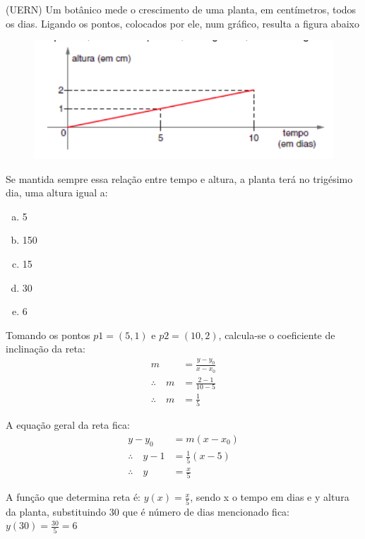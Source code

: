 \begin{multicols*}{2}
    \noindent
    (UERN) Um botânico mede o crescimento de uma planta, em centímetros, todos os dias. Ligando os 			pontos, colocados por ele, num gráfico, resulta a figura abaixo
    \begin{figure}[H]
        \centering
        \includegraphics[scale=0.4]{assets/rafael/img15.png}
    \end{figure}
    Se mantida sempre essa relação entre tempo e altura, a planta terá no trigésimo dia, uma altura 		igual a:
    \noindent
    \begin{enumerate}[(a)]
        \item 5
        \item 150
        \item 15
        \item 30
        \item 6
    \end{enumerate}

    Tomando os pontos $p1= (5,1)$  e $p2 = (10,2)$, calcula-se o coeficiente de inclinação da reta:
    \begin{align*}
        m &= \frac{y - y_0}{x - x_0} \\[1ex]
        \therefore \quad m &= \frac{2 - 1}{10 - 5}\\[1ex]
        \therefore \quad m &= \frac{1}{5}
    \end{align*}

    A equação geral da reta fica: 
    \begin{align*}
        y - y_0 &= m(x-x_0)\\[1ex]
        \therefore \quad y -1 &=  \frac{1}{5} \left(x - 5 \right)\\[1ex]
        \therefore \quad y &= \frac{x}{5}
    \end{align*}

    A função que determina reta é: $y(x) = \frac{x}{5}$, sendo x o tempo em dias e y altura da 				planta, substituindo 30 que é número de dias mencionado fica: $y(30) = \frac{30}{5} = 6$


\end{multicols*}
